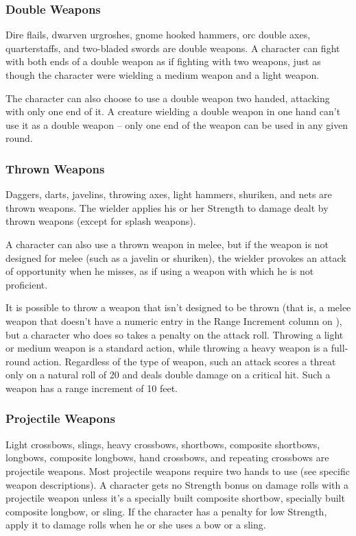 \subsubsection{Double Weapons}
Dire flails, dwarven urgroshes, gnome hooked hammers, orc double axes, quarterstaffs, and two-bladed swords are double weapons. A character can fight with both ends of a double weapon as if fighting with two weapons, just as though the character were wielding a medium weapon and a light weapon.

\par The character can also choose to use a double weapon two handed, attacking with only one end of it. A creature wielding a double weapon in one hand can't use it as a double weapon -- only one end of the weapon can be used in any given round.

\subsubsection{Thrown Weapons}
Daggers, darts, javelins, throwing axes, light hammers, shuriken, and nets are thrown weapons. The wielder applies his or her Strength to damage dealt by thrown weapons (except for splash weapons).

\par A character can also use a thrown weapon in melee, but if the weapon is not designed for melee (such as a javelin or shuriken), the wielder provokes an attack of opportunity when he misses, as if using a weapon with which he is not proficient.

It is possible to throw a weapon that isn't designed to be thrown (that is, a melee weapon that doesn't have a numeric entry in the Range Increment column on ), but a character who does so takes a  penalty on the attack roll. Throwing a light or medium weapon is a standard action, while throwing a heavy weapon is a full-round action. Regardless of the type of weapon, such an attack scores a threat only on a natural roll of 20 and deals double damage on a critical hit. Such a weapon has a range increment of 10 feet.

\subsubsection{Projectile Weapons} Light crossbows, slings, heavy crossbows, shortbows, composite shortbows, longbows, composite longbows, hand crossbows, and repeating crossbows are projectile weapons. Most projectile weapons require two hands to use (see specific weapon descriptions). A character gets no Strength bonus on damage rolls with a projectile weapon unless it's a specially built composite shortbow, specially built composite longbow, or sling. If the character has a penalty for low Strength, apply it to damage rolls when he or she uses a bow or a sling.

